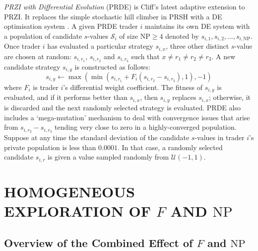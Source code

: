 \documentclass[a4paper,twoside]{article}
\begin{document}
\textit{PRZI with Differential Evolution} (PRDE) \cite{PRDE} is Cliff's latest adaptive extension to PRZI.
It replaces the simple stochastic hill climber in PRSH with a DE optimisation system \cite{StornPrice}.
A given PRDE trader $i$ maintains its own DE system with a population of candidate $s$-values $\mathcal{S}_i$ of size $\mathrm{NP}\ge4$ denoted by $s_{i,1},s_{i,2},...,s_{i,\mathrm{NP}}$.
Once trader $i$ has evaluated a particular strategy $s_{i,x}$, three other distinct $s$-value are chosen at random: $s_{i,r_1}$, $s_{i,r_2}$ and $s_{i,r_3}$ such that $x\ne r_1\ne r_2\ne r_3$.
A new candidate strategy $s_{i,y}$ is constructed as follows:
\begin{equation}
s_{i,y}\leftarrow\max(\min(s_{i,r_1}+F_i(s_{i,r_2}-s_{i,r_3}),1), -1)
\end{equation}
where $F_i$ is trader $i$'s differential weight coefficient.
The fitness of $s_{i,y}$ is evaluated, and if it performs better than $s_{i,x}$, then $s_{i,y}$ replaces $s_{i,x}$; otherwise, it is discarded and the next randomly selected strategy is evaluated.
PRDE also includes a `mega-mutation' mechanism to deal with convergence issues that arise from $s_{i,r_2}-s_{i,r_3}$ tending very close to zero in a highly-converged population.
Suppose at any time the standard deviation of the candidate $s$-values in trader $i$'s private population is less than $0.0001$.
In that case, a randomly selected candidate $s_{i,r}$ is given a value sampled randomly from $\mathcal{U}(-1,1)$.

\section{\uppercase{Homogeneous Exploration of $F$ and $\mathrm{NP}$}}

\subsection{Overview of the Combined Effect of $F$ and $\mathrm{NP}$}
\end{document}
